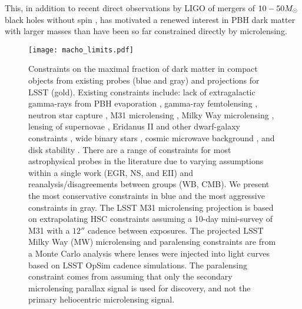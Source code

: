 This, in addition to recent direct observations by LIGO of mergers of $10-50 M_\odot$ black holes without spin \citep{1602.03837, LIGOScientific:2018b, LIGOScientific:2018a},
has motivated a renewed interest in PBH dark matter with larger masses than have been so far constrained directly by microlensing.

\begin{figure}[t]
\centering
\texttt{[image: macho\_limits.pdf]}
\caption{\label{fig:macho_constraints}
    Constraints on the maximal fraction of dark matter in compact objects from existing probes (blue and gray) and projections for LSST (gold).
    Existing constraints include: lack of extragalactic gamma-rays from PBH evaporation \citep[EGR;][]{0912.5297, 1604.05349}, gamma-ray femtolensing \citep[GF;][]{1204.2056}, neutron star capture \citep[NS][]{1301.4984}, M31 microlensing \citep[M31ML][]{1701.02151}, Milky Way microlensing \citep[MWML;][]{2007A&A...469..387T, 2001ApJ...550L.169A, 2009MNRAS.397.1228W}, lensing of supernovae \citep[LSN;][]{1712.02240,1712.06574}, Eridanus II and other dwarf-galaxy constraints \citep[EII;][]{2016ApJ...824L..31B, 1611.05052}, wide binary stars \citep[WB;][]{2009MNRAS.396L..11Q, 2004ApJ...601..311Y}, cosmic microwave background \citep[CMB;][]{2017PhRvD..95d3534A, 2008ApJ...680..829R}, and disk stability \citep[DS;][]{1985ApJ...299..633L, 1994ApJ...437..184X}.
    There are a range of constraints for most astrophysical probes in the literature due to varying assumptions within a single work (EGR, NS, and EII) and reanalysis/disagreements between groups (WB, CMB).
    We present the most conservative constraints in blue and the most aggressive constraints in gray.
    The LSST M31 microlensing projection is based on extrapolating HSC constraints \citep{1701.02151} assuming a 10-day mini-survey of M31 with a $12\second$ cadence between exposures.
    The projected LSST Milky Way (MW) microlensing and paralensing constraints are from a Monte Carlo analysis where lenses were injected into light curves based on LSST OpSim cadence simulations. 
    The paralensing constraint comes from assuming that only the secondary microlensing parallax signal is used for discovery, and not the primary heliocentric microlensing signal.
}
\end{figure}

